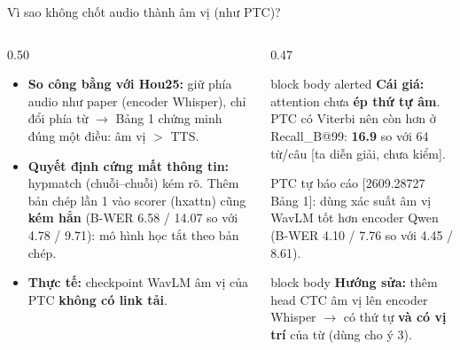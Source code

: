 \documentclass[aspectratio=169,xcolor=table]{beamer}
\newcommand{\bad}[1]{\textcolor{RiskRed}{\textbf{#1}}}
\newcommand{\src}[1]{{\tiny\color{TextGray}[#1]}}
\newcommand{\ra}{$\rightarrow$}
\begin{document}
\begin{frame}{Vì sao không chốt audio thành âm vị (như PTC)?}
\begin{columns}[T]
\begin{column}{0.50\textwidth}
\small
\begin{itemize}\itemsep4pt
\item \textbf{So công bằng với Hou25:} giữ phía audio như paper (encoder Whisper), chỉ đổi phía từ \ra{} Bảng 1 chứng minh đúng một điều: âm vị $>$ TTS.
\item \textbf{Quyết định cứng mất thông tin:} hypmatch (chuỗi--chuỗi) kém rõ. Thêm bản chép lần 1 vào scorer (hxattn) cũng \bad{kém hẳn} (B-WER 6.58 / 14.07 so với 4.78 / 9.71): mô hình học tắt theo bản chép.
\item \textbf{Thực tế:} checkpoint WavLM âm vị của PTC \bad{không có link tải}.
\end{itemize}
\end{column}
\begin{column}{0.47\textwidth}
\begin{beamercolorbox}[sep=0.5em,rounded=true]{block body alerted}
\small\textbf{Cái giá:} attention chưa \textbf{ép thứ tự âm}. PTC có Viterbi nên còn hơn ở Recall\_B@99: \textbf{16.9} so với 64 từ/câu \src{ta diễn giải, chưa kiểm}.\par\vspace{0.1cm}
PTC tự báo cáo \src{2609.28727 Bảng 1}: dùng xác suất âm vị WavLM tốt hơn encoder Qwen (B-WER 4.10 / 7.76 so với 4.45 / 8.61).
\end{beamercolorbox}
\vspace{0.15cm}
\begin{beamercolorbox}[sep=0.45em,rounded=true]{block body}
\footnotesize\textbf{Hướng sửa:} thêm head CTC âm vị lên encoder Whisper \ra{} có thứ tự \textbf{và có vị trí} của từ (dùng cho ý 3).
\end{beamercolorbox}
\end{column}
\end{columns}
\end{frame}

\end{document}
